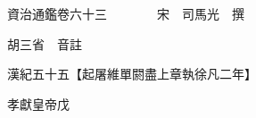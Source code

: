 










 


 
 


 

  
  
  
  
  





  
  
  
  
  
 
  

  

  
  
  



  

 
 

  
   




  

  
  


  　　資治通鑑卷六十三　　　　宋　司馬光　撰

　　胡三省　音註

　　漢紀五十五【起屠維單閼盡上章執徐凡二年】

　　孝獻皇帝戊

